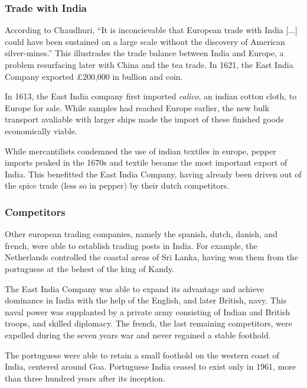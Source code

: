 \documentclass[11pt, a4paper, headings=standardclasses]{scrartcl}
\begin{document}
\subsubsection{Trade with India}

According to Chaudhuri, ``It is inconcievable that European trade with India [...] could have been sustained on a large scale without the discovery of American silver-mines.''\autocite[395]{FT} This illustrades the trade balance between India and Europe, a problem resurfacing later with China and the tea trade. In 1621, the East India Company exported \pounds{}200,000 in bullion and coin.\autocite[398]{FT}

In 1613, the East India company first imported \textit{calico}, an indian cotton cloth, to Europe for sale. While samples had reached Europe earlier, the new bulk transport avaliable with larger ships made the import of these finished goods economically viable.\autocite[400]{FT, Calico}

While mercantilists condemned the use of indian textiles in europe, pepper imports peaked in the 1670s\autocite[399]{FT} and textile became the most important export of India. This benefitted the East India Company, having already been driven out of the spice trade (less so in pepper) by their dutch competitors.\autocite[401--407]{FT}

\subsubsection{Competitors}

Other european trading companies, namely the spanish, dutch, danish, and french, were able to establish trading posts in India. For example, the Netherlands controlled the coastal areas of Sri Lanka, having won them from the portuguese at the behest of the king of Kandy.\autocite[Chapter 5]{dutch}

The East India Company was able to expand its advantage and achieve dominance in India with the help of the English, and later British, navy. This naval power was supplanted by a private army consisting of Indian and British troops, and skilled diplomacy.\autocite{ms} The french, the last remaining competitors, were expelled during the seven years war and never regained a stable foothold.\autocite[132-33]{RF} 

The portuguese were able to retain a small foothold on the western coast of India, centered around Goa. Portuguese India ceased to exist only in 1961, more than three hundred years after its inception.\autocite{PortugueseIndia}
\end{document}
